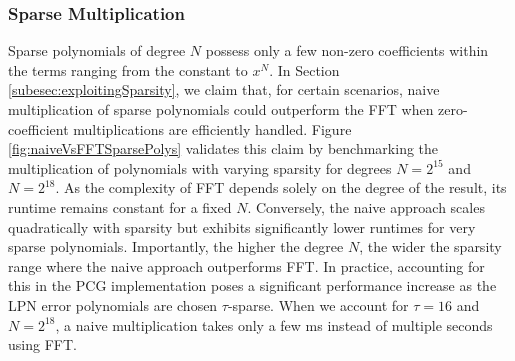 \subsubsection{Sparse Multiplication}
Sparse polynomials of degree $N$ possess only a few non-zero coefficients within the terms ranging from the constant to $x^N$. In Section \ref{subesec:exploitingSparsity}, we claim that, for certain scenarios, naive multiplication of sparse polynomials could outperform the FFT when zero-coefficient multiplications are efficiently handled. Figure \ref{fig:naiveVsFFTSparsePolys} validates this claim by benchmarking the multiplication of polynomials with varying sparsity for degrees $N=2^{15}$ and $N=2^{18}$. As the complexity of FFT depends solely on the degree of the result, its runtime remains constant for a fixed $N$.  Conversely, the naive approach scales quadratically with sparsity but exhibits significantly lower runtimes for very sparse polynomials. Importantly, the higher the degree $N$, the wider the sparsity range where the naive approach outperforms FFT. In practice, accounting for this in the PCG implementation poses a significant performance increase as the LPN error polynomials are chosen $\tau$-sparse. When we account for $\tau=16$ and $N=2^{18}$, a naive multiplication takes only a few ms instead of multiple seconds using FFT.

